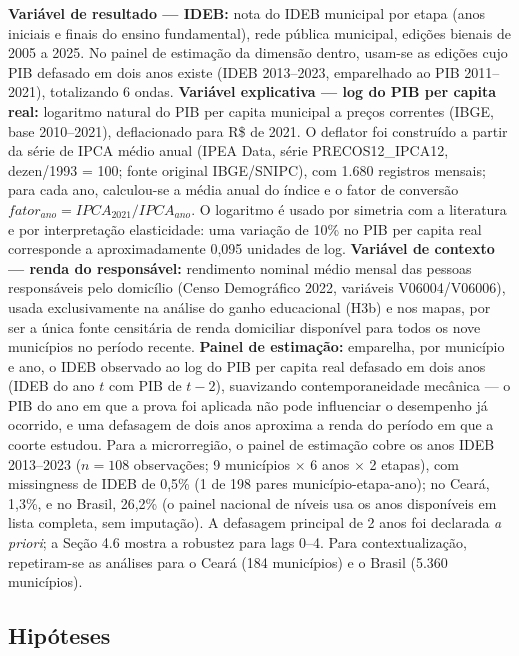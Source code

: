 \documentclass[12pt,a4paper]{article}
\begin{document}
\textbf{Variável de resultado --- IDEB:} nota do IDEB municipal por etapa (anos iniciais e finais do ensino fundamental), rede pública municipal, edições bienais de 2005 a 2025. No painel de estimação da dimensão dentro, usam-se as edições cujo PIB defasado em dois anos existe (IDEB 2013--2023, emparelhado ao PIB 2011--2021), totalizando 6 ondas. \textbf{Variável explicativa --- log do PIB per capita real:} logaritmo natural do PIB per capita municipal a preços correntes (IBGE, base 2010--2021), deflacionado para R\$ de 2021. O deflator foi construído a partir da série de IPCA médio anual (IPEA Data, série PRECOS12\_IPCA12, dezen/1993 = 100; fonte original IBGE/SNIPC), com 1.680 registros mensais; para cada ano, calculou-se a média anual do índice e o fator de conversão $fator_{ano} = IPCA_{2021} / IPCA_{ano}$. O logaritmo é usado por simetria com a literatura e por interpretação elasticidade: uma variação de 10\% no PIB per capita real corresponde a aproximadamente 0,095 unidades de log. \textbf{Variável de contexto --- renda do responsável:} rendimento nominal médio mensal das pessoas responsáveis pelo domicílio (Censo Demográfico 2022, variáveis V06004/V06006), usada exclusivamente na análise do ganho educacional (H3b) e nos mapas, por ser a única fonte censitária de renda domiciliar disponível para todos os nove municípios no período recente. \textbf{Painel de estimação:} emparelha, por município e ano, o IDEB observado ao log do PIB per capita real defasado em dois anos (IDEB do ano $t$ com PIB de $t-2$), suavizando contemporaneidade mecânica --- o PIB do ano em que a prova foi aplicada não pode influenciar o desempenho já ocorrido, e uma defasagem de dois anos aproxima a renda do período em que a coorte estudou. Para a microrregião, o painel de estimação cobre os anos IDEB 2013--2023 ($n = 108$ observações; 9 municípios $\times$ 6 anos $\times$ 2 etapas), com missingness de IDEB de 0,5\% (1 de 198 pares município-etapa-ano); no Ceará, 1,3\%, e no Brasil, 26,2\% (o painel nacional de níveis usa os anos disponíveis em lista completa, sem imputação). A defasagem principal de 2 anos foi declarada \textit{a priori}; a Seção 4.6 mostra a robustez para lags 0--4. Para contextualização, repetiram-se as análises para o Ceará (184 municípios) e o Brasil (5.360 municípios).

\subsection{Hipóteses}
\end{document}
